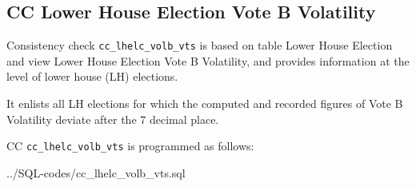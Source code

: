 \subsection{CC Lower House Election Vote B Volatility}\label{cc_lhelc_volb_vts}
Consistency check \texttt{\footnotesize cc\_lhelc\_volb\_vts} is based on table Lower House Election and view Lower House Election Vote B Volatility, and provides information at the level of lower house (LH) elections.

It enlists all LH elections for which the computed and recorded figures of Vote B Volatility deviate after the 7  decimal place.

CC \texttt{\footnotesize cc\_lhelc\_volb\_vts} is programmed as follows:

%
{../SQL-codes/cc_lhelc_volb_vts.sql}

